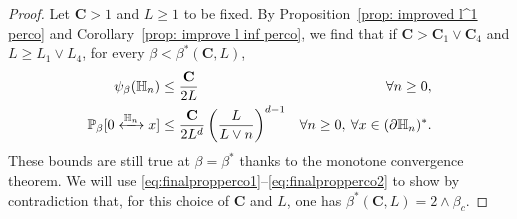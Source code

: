 \documentclass[11pt,a4paper]{article}
\numberwithin{equation}{section}
\theoremstyle{plain}
\theoremstyle{definition}
\newcommand\bfC{\mathbf{C}}
\newcommand{\connect}{\xleftrightarrow}
\begin{document}
\begin{proof} Let $\bfC>1$ and $L\geq 1$ to be fixed.
By Proposition~\ref{prop: improved l^1 perco} and Corollary~\ref{prop: improve l inf perco}, we find that if $\bfC>\bfC_1\vee \bfC_4$ and $L\geq L_1\vee L_4$, for every $\beta<\beta^*(\bfC,L)$,
\begin{align}
\psi_\beta(\mathbb H_n)&\le\frac{\bfC}{2L}&\forall n\ge0,\label{eq:finalpropperco1}\\
\mathbb P_\beta[0\connect{\mathbb H_n\:}x]&\le \frac{\bfC}{2L^d}\left(\frac{L}{L\vee n}\right)^{d-1}&\forall n\geq 0, \: \forall x\in (\partial\mathbb H_n)^*.\label{eq:finalpropperco2}
\end{align}
These bounds are still true at $\beta=\beta^*$ thanks to the monotone convergence theorem. We will use \eqref{eq:finalpropperco1}--\eqref{eq:finalpropperco2} to show by contradiction that, for this choice of $\bfC$ and $L$, one has $\beta^*(\bfC,L)=2\wedge \beta_c$.


\end{proof}
\end{document}
